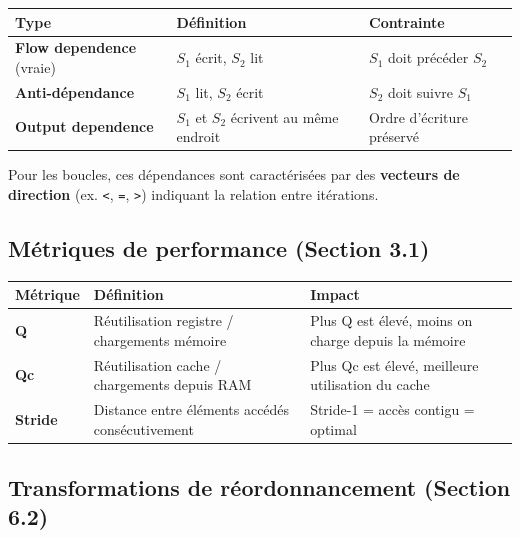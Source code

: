 \documentclass[a4paper,11pt]{article}
\begin{document}
\begin{center}
\begin{tabular}{L{3.2cm}L{5cm}L{5cm}}
  \toprule
  \textbf{Type} & \textbf{D\'efinition} & \textbf{Contrainte} \\
  \midrule
  \textbf{Flow dependence} (vraie) & $S_1$ \'ecrit, $S_2$ lit & $S_1$ doit pr\'ec\'eder $S_2$ \\
  \textbf{Anti-d\'ependance}       & $S_1$ lit, $S_2$ \'ecrit & $S_2$ doit suivre $S_1$ \\
  \textbf{Output dependence}       & $S_1$ et $S_2$ \'ecrivent au m\^eme endroit & Ordre d'\'ecriture pr\'eserv\'e \\
  \bottomrule
\end{tabular}
\end{center}

Pour les boucles, ces d\'ependances sont caract\'eris\'ees par des \textbf{vecteurs de
direction} (ex. \texttt{<}, \texttt{=}, \texttt{>}) indiquant la relation entre
it\'erations.

\subsection{M\'etriques de performance (Section 3.1)}

\begin{center}
\begin{tabular}{L{2.5cm}L{4cm}L{6.5cm}}
  \toprule
  \textbf{M\'etrique} & \textbf{D\'efinition} & \textbf{Impact} \\
  \midrule
  \textbf{Q}      & R\'eutilisation registre / chargements m\'emoire & Plus Q est \'elev\'e, moins on charge depuis la m\'emoire \\
  \textbf{Qc}     & R\'eutilisation cache / chargements depuis RAM   & Plus Qc est \'elev\'e, meilleure utilisation du cache \\
  \textbf{Stride} & Distance entre \'el\'ements acc\'ed\'es cons\'ecutivement & Stride-1 = acc\`es contigu = optimal \\
  \bottomrule
\end{tabular}
\end{center}

\subsection{Transformations de r\'eordonnancement (Section 6.2)}
\end{document}
